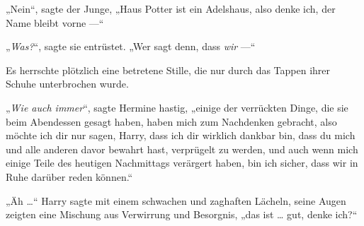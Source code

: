 „Nein“, sagte der Junge,
„Haus Potter ist ein Adelshaus, also denke ich, der Name bleibt vorne —“

„\emph{Was?}“, sagte sie entrüstet.
„Wer sagt denn, dass \emph{wir} —“

Es herrschte plötzlich eine betretene Stille, die nur durch das Tappen ihrer Schuhe unterbrochen wurde.

„\emph{Wie auch immer}“, sagte Hermine hastig, „einige der verrückten Dinge, die sie beim Abendessen gesagt haben, haben mich zum Nachdenken gebracht, also möchte ich dir nur sagen, Harry, dass ich dir wirklich dankbar bin, dass du mich und alle anderen davor bewahrt hast, verprügelt zu werden, und auch wenn mich einige Teile des heutigen Nachmittags verärgert haben, bin ich sicher, dass wir in Ruhe darüber reden können.“

„Äh …“ Harry sagte mit einem schwachen und zaghaften Lächeln, seine Augen zeigten eine Mischung aus Verwirrung und Besorgnis, „das ist … gut, denke ich?“


